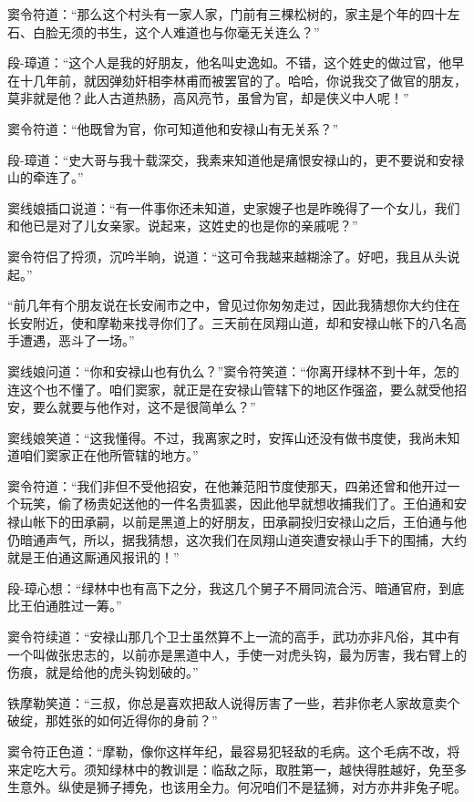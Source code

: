\documentclass[12pt,oneside]{book}
\begin{document}
窦令符道：``那么这个村头有一家人家，门前有三棵松树的，家主是个年的四十左石、白脸无须的书生，这个人难道也与你毫无关连么？''

段-璋道：``这个人是我的好朋友，他名叫史逸如。不错，这个姓史的做过官，他早在十几年前，就因弹劾奸相李林甫而被罢官的了。哈哈，你说我交了做官的朋友，莫非就是他？此人古道热肠，高风亮节，虽曾为官，却是侠义中人呢！''

窦令符道：``他既曾为官，你可知道他和安禄山有无关系？''

段-璋道：``史大哥与我十载深交，我素来知道他是痛恨安禄山的，更不要说和安禄山的牵连了。''

窦线娘插口说道：``有一件事你还未知道，史家嫂子也是昨晚得了一个女儿，我们和他已是对了儿女亲家。说起来，这姓史的也是你的亲戚呢？''

窦令符侣了捋须，沉吟半晌，说道：``这可令我越来越糊涂了。好吧，我且从头说起。''

``前几年有个朋友说在长安闹市之中，曾见过你匆匆走过，因此我猜想你大约住在长安附近，使和摩勒来找寻你们了。三天前在凤翔山道，却和安禄山帐下的八名高手遭遇，恶斗了一场。''

窦线娘问道：``你和安禄山也有仇么？''窦令符笑道：``你离开绿林不到十年，怎的连这个也不懂了。咱们窦家，就正是在安禄山管辖下的地区作强盗，要么就受他招安，要么就要与他作对，这不是很简单么？''

窦线娘笑道：``这我懂得。不过，我离家之时，安挥山还没有做书度使，我尚未知道咱们窦家正在他所管辖的地方。''

窦令符道：``我们非但不受他招安，在他兼范阳节度使那天，四弟还曾和他开过一个玩笑，偷了杨贵妃送他的一件名贵狐裘，因此他早就想收捕我们了。王伯通和安禄山帐下的田承嗣，以前是黑道上的好朋友，田承嗣投归安禄山之后，王伯通与他仍暗通声气，所以，据我猜想，这次我们在凤翔山道突遭安禄山手下的围捕，大约就是王伯通这厮通风报讯的！''

段-璋心想：``绿林中也有高下之分，我这几个舅子不屑同流合污、暗通官府，到底比王伯通胜过一筹。''

窦令符续道：``安禄山那几个卫士虽然算不上一流的高手，武功亦非凡俗，其中有一个叫做张忠志的，以前亦是黑道中人，手使一对虎头钩，最为厉害，我右臂上的伤痕，就是给他的虎头钩划破的。''

铁摩勒笑道：``三叔，你总是喜欢把敌人说得厉害了一些，若非你老人家故意卖个破绽，那姓张的如何近得你的身前？''

窦令符正色道：``摩勒，像你这样年纪，最容易犯轻敌的毛病。这个毛病不改，将来定吃大亏。须知绿林中的教训是：临敌之际，取胜第一，越快得胜越好，免至多生意外。纵使是狮子搏免，也该用全力。何况咱们不是猛狮，对方亦井非兔子呢。
\end{document}
